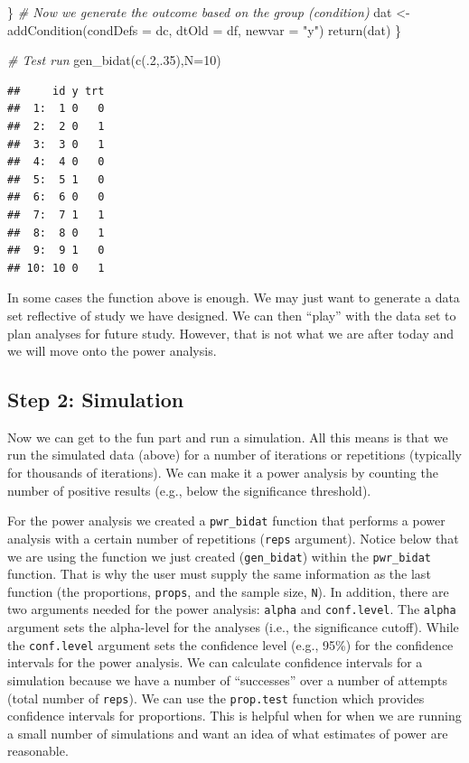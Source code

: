 \documentclass[
]{book}
\newenvironment{Shaded}{\begin{snugshade}}{\end{snugshade}}
\newcommand{\AttributeTok}[1]{\textcolor[rgb]{0.77,0.63,0.00}{#1}}
\newcommand{\CommentTok}[1]{\textcolor[rgb]{0.56,0.35,0.01}{\textit{#1}}}
\newcommand{\DecValTok}[1]{\textcolor[rgb]{0.00,0.00,0.81}{#1}}
\newcommand{\FunctionTok}[1]{\textcolor[rgb]{0.00,0.00,0.00}{#1}}
\newcommand{\NormalTok}[1]{#1}
\newcommand{\OtherTok}[1]{\textcolor[rgb]{0.56,0.35,0.01}{#1}}
\newcommand{\StringTok}[1]{\textcolor[rgb]{0.31,0.60,0.02}{#1}}
\begin{document}
\begin{Shaded}
\begin{Highlighting}[]
\NormalTok{  \}}
  \CommentTok{\# Now we generate the outcome based on the group (condition)}
\NormalTok{  dat }\OtherTok{\textless{}{-}} \FunctionTok{addCondition}\NormalTok{(}\AttributeTok{condDefs =}\NormalTok{ dc,}
                      \AttributeTok{dtOld =}\NormalTok{ df,}
                      \AttributeTok{newvar =} \StringTok{"y"}\NormalTok{)}
  \FunctionTok{return}\NormalTok{(dat)}
\NormalTok{\}}

\CommentTok{\# Test run}
\FunctionTok{gen\_bidat}\NormalTok{(}\FunctionTok{c}\NormalTok{(.}\DecValTok{2}\NormalTok{,.}\DecValTok{35}\NormalTok{),}\AttributeTok{N=}\DecValTok{10}\NormalTok{)}
\end{Highlighting}
\end{Shaded}

\begin{verbatim}
##     id y trt
##  1:  1 0   0
##  2:  2 0   1
##  3:  3 0   1
##  4:  4 0   0
##  5:  5 1   0
##  6:  6 0   0
##  7:  7 1   1
##  8:  8 0   1
##  9:  9 1   0
## 10: 10 0   1
\end{verbatim}

In some cases the function above is enough. We may just want to generate a data set reflective of study we have designed. We can then ``play'' with the data set to plan analyses for future study. However, that is not what we are after today and we will move onto the power analysis.

\hypertarget{step-2-simulation}{%
\subsection{Step 2: Simulation}\label{step-2-simulation}}

Now we can get to the fun part and run a simulation. All this means is that we run the simulated data (above) for a number of iterations or repetitions (typically for thousands of iterations). We can make it a power analysis by counting the number of positive results (e.g., below the significance threshold).

For the power analysis we created a \texttt{pwr\_bidat} function that performs a power analysis with a certain number of repetitions (\texttt{reps} argument). Notice below that we are using the function we just created (\texttt{gen\_bidat}) within the \texttt{pwr\_bidat} function. That is why the user must supply the same information as the last function (the proportions, \texttt{props}, and the sample size, \texttt{N}). In addition, there are two arguments needed for the power analysis: \texttt{alpha} and \texttt{conf.level}. The \texttt{alpha} argument sets the alpha-level for the analyses (i.e., the significance cutoff). While the \texttt{conf.level} argument sets the confidence level (e.g., 95\%) for the confidence intervals for the power analysis. We can calculate confidence intervals for a simulation because we have a number of ``successes'' over a number of attempts (total number of \texttt{reps}). We can use the \texttt{prop.test} function which provides confidence intervals for proportions. This is helpful when for when we are running a small number of simulations and want an idea of what estimates of power are reasonable.
\end{document}
